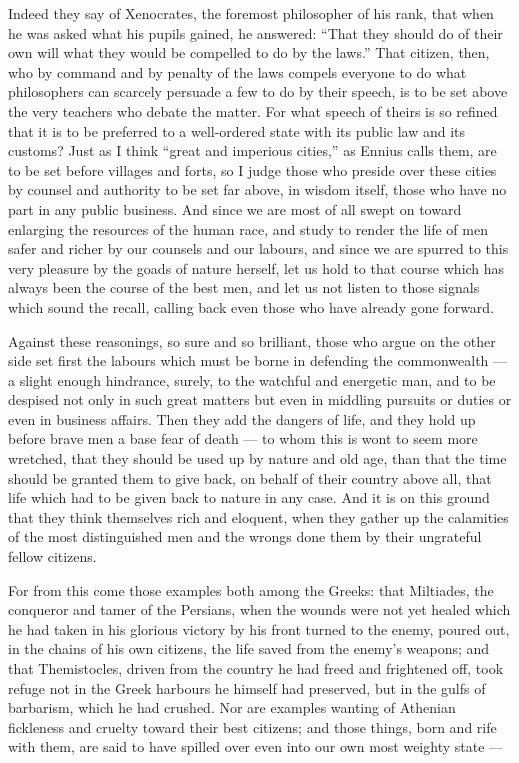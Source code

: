  Indeed they say of Xenocrates, the foremost philosopher of his rank, that when he was asked what his pupils gained, he answered: ``That they should do of their own will what they would be compelled to do by the laws.'' That citizen, then, who by command and by penalty of the laws compels everyone to do what philosophers can scarcely persuade a few to do by their speech, is to be set above the very teachers who debate the matter. For what speech of theirs is so refined that it is to be preferred to a well-ordered state with its public law and its customs? Just as I think ``great and imperious cities,'' as Ennius calls them, are to be set before villages and forts, so I judge those who preside over these cities by counsel and authority to be set far above, in wisdom itself, those who have no part in any public business. And since we are most of all swept on toward enlarging the resources of the human race, and study to render the life of men safer and richer by our counsels and our labours, and since we are spurred to this very pleasure by the goads of nature herself, let us hold to that course which has always been the course of the best men, and let us not listen to those signals which sound the recall, calling back even those who have already gone forward.

 Against these reasonings, so sure and so brilliant, those who argue on the other side set first the labours which must be borne in defending the commonwealth --- a slight enough hindrance, surely, to the watchful and energetic man, and to be despised not only in such great matters but even in middling pursuits or duties or even in business affairs. Then they add the dangers of life, and they hold up before brave men a base fear of death --- to whom this is wont to seem more wretched, that they should be used up by nature and old age, than that the time should be granted them to give back, on behalf of their country above all, that life which had to be given back to nature in any case. And it is on this ground that they think themselves rich and eloquent, when they gather up the calamities of the most distinguished men and the wrongs done them by their ungrateful fellow citizens.

 For from this come those examples both among the Greeks: that Miltiades, the conqueror and tamer of the Persians, when the wounds were not yet healed which he had taken in his glorious victory by his front turned to the enemy, poured out, in the chains of his own citizens, the life saved from the enemy's weapons; and that Themistocles, driven from the country he had freed and frightened off, took refuge not in the Greek harbours he himself had preserved, but in the gulfs of barbarism, which he had crushed. Nor are examples wanting of Athenian fickleness and cruelty toward their best citizens; and those things, born and rife with them, are said to have spilled over even into our own most weighty state ---

